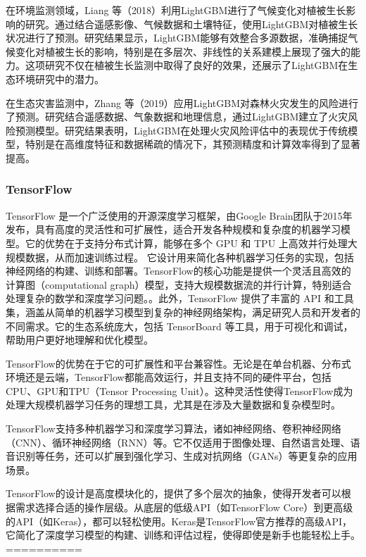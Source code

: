 \documentclass{article}
\begin{document}
	在环境监测领域，Liang 等（2018）利用LightGBM进行了气候变化对植被生长影响的研究\cite{liang2018}。通过结合遥感影像、气候数据和土壤特征，使用LightGBM对植被生长状况进行了预测。研究结果显示，LightGBM能够有效整合多源数据，准确捕捉气候变化对植被生长的影响，特别是在多层次、非线性的关系建模上展现了强大的能力。这项研究不仅在植被生长监测中取得了良好的效果，还展示了LightGBM在生态环境研究中的潜力。
	
	在生态灾害监测中，Zhang 等（2019）应用LightGBM对森林火灾发生的风险进行了预测\cite{zhang2019}。研究结合遥感数据、气象数据和地理信息，通过LightGBM建立了火灾风险预测模型。研究结果表明，LightGBM在处理火灾风险评估中的表现优于传统模型，特别是在高维度特征和数据稀疏的情况下，其预测精度和计算效率得到了显著提高。
	
	
	\subsubsection{TensorFlow}
	
	TensorFlow 是一个广泛使用的开源深度学习框架，由Google Brain团队于2015年发布，具有高度的灵活性和可扩展性，适合开发各种规模和复杂度的机器学习模型。它的优势在于支持分布式计算，能够在多个 GPU 和 TPU 上高效并行处理大规模数据，从而加速训练过程。
	它设计用来简化各种机器学习任务的实现，包括神经网络的构建、训练和部署。TensorFlow的核心功能是提供一个灵活且高效的计算图（computational graph）模型，支持大规模数据流的并行计算，特别适合处理复杂的数学和深度学习问题。。此外，TensorFlow 提供了丰富的 API 和工具集，涵盖从简单的机器学习模型到复杂的神经网络架构，满足研究人员和开发者的不同需求。它的生态系统庞大，包括 TensorBoard 等工具，用于可视化和调试，帮助用户更好地理解和优化模型。
		
	TensorFlow的优势在于它的可扩展性和平台兼容性。无论是在单台机器、分布式环境还是云端，TensorFlow都能高效运行，并且支持不同的硬件平台，包括CPU、GPU和TPU（Tensor Processing Unit）。这种灵活性使得TensorFlow成为处理大规模机器学习任务的理想工具，尤其是在涉及大量数据和复杂模型时。
	
	TensorFlow支持多种机器学习和深度学习算法，诸如神经网络、卷积神经网络（CNN）、循环神经网络（RNN）等。它不仅适用于图像处理、自然语言处理、语音识别等任务，还可以扩展到强化学习、生成对抗网络（GANs）等更复杂的应用场景。
	
	TensorFlow的设计是高度模块化的，提供了多个层次的抽象，使得开发者可以根据需求选择合适的操作层级。从底层的低级API（如TensorFlow Core）到更高级的API（如Keras），都可以轻松使用。Keras是TensorFlow官方推荐的高级API，它简化了深度学习模型的构建、训练和评估过程，使得即使是新手也能轻松上手。==========
	
\end{document}
